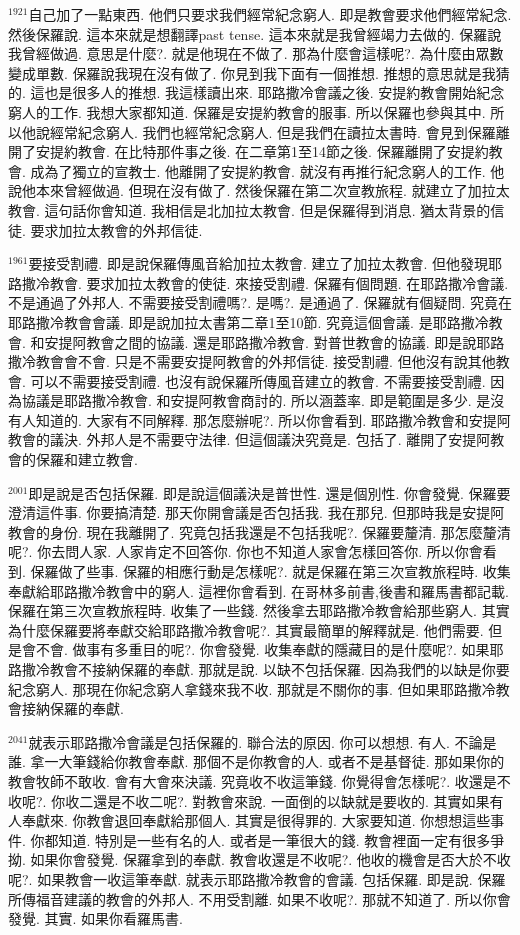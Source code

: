 \documentclass{book}
\begin{document}
$^{1921}$自己加了一點東西.
他們只要求我們經常紀念窮人.
即是教會要求他們經常紀念.
然後保羅說.
這本來就是想翻譯past tense.
這本來就是我曾經竭力去做的.
保羅說我曾經做過.
意思是什麼?.
就是他現在不做了.
那為什麼會這樣呢?.
為什麼由眾數變成單數.
保羅說我現在沒有做了.
你見到我下面有一個推想.
推想的意思就是我猜的.
這也是很多人的推想.
我這樣讀出來.
耶路撒冷會議之後.
安提約教會開始紀念窮人的工作.
我想大家都知道.
保羅是安提約教會的服事.
所以保羅也參與其中.
所以他說經常紀念窮人.
我們也經常紀念窮人.
但是我們在讀拉太書時.
會見到保羅離開了安提約教會.
在比特那件事之後.
在二章第1至14節之後.
保羅離開了安提約教會.
成為了獨立的宣教士.
他離開了安提約教會.
就沒有再推行紀念窮人的工作.
他說他本來曾經做過.
但現在沒有做了.
然後保羅在第二次宣教旅程.
就建立了加拉太教會.
這句話你會知道.
我相信是北加拉太教會.
但是保羅得到消息.
猶太背景的信徒.
要求加拉太教會的外邦信徒.

$^{1961}$要接受割禮.
即是說保羅傳風音給加拉太教會.
建立了加拉太教會.
但他發現耶路撒冷教會.
要求加拉太教會的使徒.
來接受割禮.
保羅有個問題.
在耶路撒冷會議.
不是通過了外邦人.
不需要接受割禮嗎?.
是嗎?.
是通過了.
保羅就有個疑問.
究竟在耶路撒冷教會會議.
即是說加拉太書第二章1至10節.
究竟這個會議.
是耶路撒冷教會.
和安提阿教會之間的協議.
還是耶路撒冷教會.
對普世教會的協議.
即是說耶路撒冷教會會不會.
只是不需要安提阿教會的外邦信徒.
接受割禮.
但他沒有說其他教會.
可以不需要接受割禮.
也沒有說保羅所傳風音建立的教會.
不需要接受割禮.
因為協議是耶路撒冷教會.
和安提阿教會商討的.
所以涵蓋率.
即是範圍是多少.
是沒有人知道的.
大家有不同解釋.
那怎麼辦呢?.
所以你會看到.
耶路撒冷教會和安提阿教會的議決.
外邦人是不需要守法律.
但這個議決究竟是.
包括了.
離開了安提阿教會的保羅和建立教會.

$^{2001}$即是說是否包括保羅.
即是說這個議決是普世性.
還是個別性.
你會發覺.
保羅要澄清這件事.
你要搞清楚.
那天你開會議是否包括我.
我在那兒.
但那時我是安提阿教會的身份.
現在我離開了.
究竟包括我還是不包括我呢?.
保羅要釐清.
那怎麼釐清呢?.
你去問人家.
人家肯定不回答你.
你也不知道人家會怎樣回答你.
所以你會看到.
保羅做了些事.
保羅的相應行動是怎樣呢?.
就是保羅在第三次宣教旅程時.
收集奉獻給耶路撒冷教會中的窮人.
這裡你會看到.
在哥林多前書,後書和羅馬書都記載.
保羅在第三次宣教旅程時.
收集了一些錢.
然後拿去耶路撒冷教會給那些窮人.
其實為什麼保羅要將奉獻交給耶路撒冷教會呢?.
其實最簡單的解釋就是.
他們需要.
但是會不會.
做事有多重目的呢?.
你會發覺.
收集奉獻的隱藏目的是什麼呢?.
如果耶路撒冷教會不接納保羅的奉獻.
那就是說.
以缺不包括保羅.
因為我們的以缺是你要紀念窮人.
那現在你紀念窮人拿錢來我不收.
那就是不關你的事.
但如果耶路撒冷教會接納保羅的奉獻.

$^{2041}$就表示耶路撒冷會議是包括保羅的.
聯合法的原因.
你可以想想.
有人.
不論是誰.
拿一大筆錢給你教會奉獻.
那個不是你教會的人.
或者不是基督徒.
那如果你的教會牧師不敢收.
會有大會來決議.
究竟收不收這筆錢.
你覺得會怎樣呢?.
收還是不收呢?.
你收二還是不收二呢?.
對教會來說.
一面倒的以缺就是要收的.
其實如果有人奉獻來.
你教會退回奉獻給那個人.
其實是很得罪的.
大家要知道.
你想想這些事件.
你都知道.
特別是一些有名的人.
或者是一筆很大的錢.
教會裡面一定有很多爭拗.
如果你會發覺.
保羅拿到的奉獻.
教會收還是不收呢?.
他收的機會是否大於不收呢?.
如果教會一收這筆奉獻.
就表示耶路撒冷教會的會議.
包括保羅.
即是說.
保羅所傳福音建議的教會的外邦人.
不用受割離.
如果不收呢?.
那就不知道了.
所以你會發覺.
其實.
如果你看羅馬書.
\end{document}
